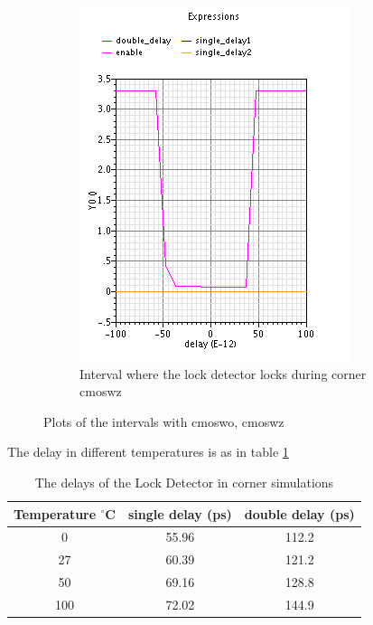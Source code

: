 \documentclass[a4paper,12pt]{article} \usepackage{graphicx}
\newcommand{\degree}{\ensuremath{^\circ}}
\begin{document}
\begin{figure}[h]
\begin{subfigure}[b]{.5\textwidth}
        \centering
        \includegraphics[width=\textwidth]{../Bilder/LD_tran/PD_wz.png}
        \caption{Interval where the lock detector locks during corner cmoswz}
\end{subfigure}
\caption{Plots of the intervals with cmoswo, cmoswz}
\label{fig:LD_wo_wz}
\end{figure}

The delay in different temperatures is as in table \ref{tab:LD_temperature}
\begin{table}[h]
        \centering
        \begin{tabular}{|c|c|c|}
                \hline
                \textbf{Temperature $\degree$C} & \textbf{single delay
                  (ps)} & \textbf{double delay (ps)} \\
                \hline
                0 & 55.96 & 112.2 \\
                27 & 60.39 & 121.2 \\
                50 & 69.16 & 128.8 \\
                100 & 72.02 & 144.9 \\
                \hline
        \end{tabular}
        \caption{The delays of the Lock Detector in corner simulations}
        \label{tab:LD_temperature}
\end{table}
\end{document}
